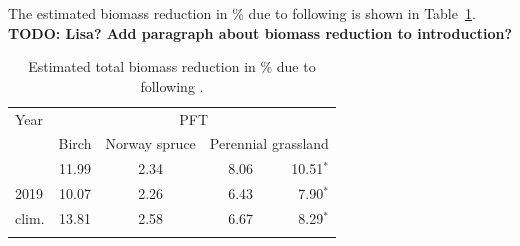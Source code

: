 \documentclass[bg, manuscript]{copernicus}
\begin{document}
The estimated biomass reduction in \unit{\%} due to  following \citet{ICP:MappingManual2017} is shown in Table~\ref{tab:biomass_reduction}. {\bf TODO: Lisa? Add paragraph about biomass reduction to introduction?}



\begin{table}[t]
  \caption{Estimated total biomass reduction in \unit{\%} due to  following \citet{ICP:MappingManual2017}.}
  \label{tab:biomass_reduction}
\begin{tabular}{lccrr}
\tophline
Year & \multicolumn{4}{c}{PFT}\\
& Birch & Norway spruce & \multicolumn{2}{c}{Perennial grassland}\\
\middlehline
2018 & 11.99 & 2.34 & 8.06 & 10.51$^*$\\
2019 & 10.07 & 2.26 & 6.43 & 7.90$^*$\\
clim. & 13.81 & 2.58 & 6.67 & 8.29$^*$\\
\bottomhline
\end{tabular}
\end{table}
\end{document}
